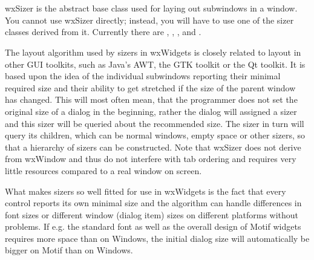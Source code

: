 \section{}\label{wxsizer}

wxSizer is the abstract base class used for laying out subwindows in a window. You
cannot use wxSizer directly; instead, you will have to use one of the sizer
classes derived from it. Currently there are , 
,
,  
and .

The layout algorithm used by sizers in wxWidgets is closely related to layout
in other GUI toolkits, such as Java's AWT, the GTK toolkit or the Qt toolkit. It is
based upon the idea of the individual subwindows reporting their minimal required
size and their ability to get stretched if the size of the parent window has changed.
This will most often mean, that the programmer does not set the original size of
a dialog in the beginning, rather the dialog will assigned a sizer and this sizer
will be queried about the recommended size. The sizer in turn will query its
children, which can be normal windows, empty space or other sizers, so that
a hierarchy of sizers can be constructed. Note that wxSizer does not derive from wxWindow
and thus do not interfere with tab ordering and requires very little resources compared
to a real window on screen.

What makes sizers so well fitted for use in wxWidgets is the fact that every control
reports its own minimal size and the algorithm can handle differences in font sizes
or different window (dialog item) sizes on different platforms without problems. If e.g.
the standard font as well as the overall design of Motif widgets requires more space than
on Windows, the initial dialog size will automatically be bigger on Motif than on Windows.







